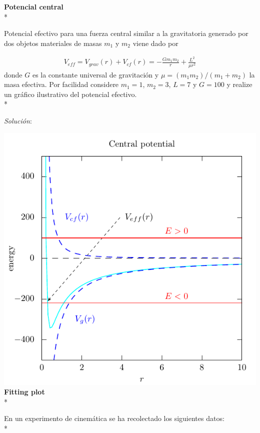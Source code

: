 \documentclass[11.5pt,a4paper]{article}
\begin{document}
\textbf{Potencial central}\\*

Potencial efectivo para una fuerza central similar a la gravitatoria generado por dos objetos materiales de masas $m_1$ y $m_2$ viene dado por

\begin{eqnarray*}
V_{eff} = V_{grav}(r)+V_{cf}(r)=-\frac{G m_1 m_2}{r}+\frac{L^2}{\mu r^2}
\end{eqnarray*}
donde $G$ es la constante universal de gravitación y $\mu = (m_1 m_2)/(m_1+m_2)$ la masa efectiva. Por facilidad considere $m_1=1$, $m_2=3$, $L=7$ y $G=100$ y realize un gráfico ilustrativo del potencial efectivo.\\*

\textit{Solución}:

\includegraphics[scale=0.75]{ejercicio2.pdf}\\

\textbf{Fitting plot}\\*

En un experimento de cinemática se ha recolectado los siguientes datos:\\*
\end{document}
